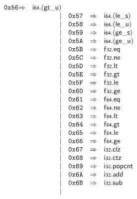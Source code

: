 $$\begin{array}{@{}l@{}rrlll@{}l@{}}
\mathtt{0x56} &\Rightarrow& \mathsf{i{\scriptstyle64}} . ({\mathsf{gt\_}}{\mathsf{u}}) \\ &&|&
\mathtt{0x57} &\Rightarrow& \mathsf{i{\scriptstyle64}} . ({\mathsf{le\_}}{\mathsf{s}}) \\ &&|&
\mathtt{0x58} &\Rightarrow& \mathsf{i{\scriptstyle64}} . ({\mathsf{le\_}}{\mathsf{u}}) \\ &&|&
\mathtt{0x59} &\Rightarrow& \mathsf{i{\scriptstyle64}} . ({\mathsf{ge\_}}{\mathsf{s}}) \\ &&|&
\mathtt{0x5A} &\Rightarrow& \mathsf{i{\scriptstyle64}} . ({\mathsf{ge\_}}{\mathsf{u}}) \\ &&|&
\mathtt{0x5B} &\Rightarrow& \mathsf{f{\scriptstyle32}} . \mathsf{eq} \\ &&|&
\mathtt{0x5C} &\Rightarrow& \mathsf{f{\scriptstyle32}} . \mathsf{ne} \\ &&|&
\mathtt{0x5D} &\Rightarrow& \mathsf{f{\scriptstyle32}} . \mathsf{lt} \\ &&|&
\mathtt{0x5E} &\Rightarrow& \mathsf{f{\scriptstyle32}} . \mathsf{gt} \\ &&|&
\mathtt{0x5F} &\Rightarrow& \mathsf{f{\scriptstyle32}} . \mathsf{le} \\ &&|&
\mathtt{0x60} &\Rightarrow& \mathsf{f{\scriptstyle32}} . \mathsf{ge} \\ &&|&
\mathtt{0x61} &\Rightarrow& \mathsf{f{\scriptstyle64}} . \mathsf{eq} \\ &&|&
\mathtt{0x62} &\Rightarrow& \mathsf{f{\scriptstyle64}} . \mathsf{ne} \\ &&|&
\mathtt{0x63} &\Rightarrow& \mathsf{f{\scriptstyle64}} . \mathsf{lt} \\ &&|&
\mathtt{0x64} &\Rightarrow& \mathsf{f{\scriptstyle64}} . \mathsf{gt} \\ &&|&
\mathtt{0x65} &\Rightarrow& \mathsf{f{\scriptstyle64}} . \mathsf{le} \\ &&|&
\mathtt{0x66} &\Rightarrow& \mathsf{f{\scriptstyle64}} . \mathsf{ge} \\ &&|&
\mathtt{0x67} &\Rightarrow& \mathsf{i{\scriptstyle32}} . \mathsf{clz} \\ &&|&
\mathtt{0x68} &\Rightarrow& \mathsf{i{\scriptstyle32}} . \mathsf{ctz} \\ &&|&
\mathtt{0x69} &\Rightarrow& \mathsf{i{\scriptstyle32}} . \mathsf{popcnt} \\ &&|&
\mathtt{0x6A} &\Rightarrow& \mathsf{i{\scriptstyle32}} . \mathsf{add} \\ &&|&
\mathtt{0x6B} &\Rightarrow& \mathsf{i{\scriptstyle32}} . \mathsf{sub} \\ &&|&

\end{array}$$
